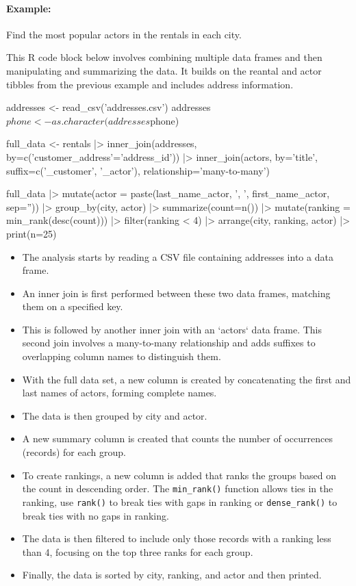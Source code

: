 \paragraph*{Example:} Find the most popular actors in the rentals in each city.

This R code block below involves combining multiple data frames and then manipulating and summarizing the data. It builds on the reantal and actor tibbles from the previous example and includes address information.

\begin{samepage}
\begin{Rcode}
addresses <- read_csv('addresses.csv')
addresses$phone <- as.character(addresses$phone)

full_data <- 
  rentals |> 
    inner_join(addresses, by=c('customer_address'='address_id')) |>
    inner_join(actors, by='title',
      suffix=c('_customer', '_actor'),
      relationship='many-to-many')
       
full_data |> 
  mutate(actor = 
    paste(last_name_actor, ', ', first_name_actor, sep='')) |>
  group_by(city, actor) |>
  summarize(count=n()) |>
  mutate(ranking = min_rank(desc(count))) |>
  filter(ranking < 4) |>
  arrange(city, ranking, actor) |>
  print(n=25)
\end{Rcode}
\end{samepage}

\begin{itemize} 
\item The analysis starts by reading a CSV file containing addresses into a data frame.
\item An inner join is first performed between these two data frames, matching them on a specified key. 
\item This is followed by another inner join with an `actors` data frame. This second join involves a many-to-many relationship and adds suffixes to overlapping column names to distinguish them.
\item With the full data set, a new column is created by concatenating the first and last names of actors, forming complete names. 
\item The data is then grouped by city and actor.
\item A new summary column is created that counts the number of occurrences (records) for each group.
\item To create rankings, a new column is added that ranks the groups based on the count in descending order. The \texttt{min\_rank()} function allows ties in the ranking, use \texttt{rank()} to break ties with gaps in ranking or \texttt{dense\_rank()} to break ties with no gaps in ranking.
\item The data is then filtered to include only those records with a ranking less than 4, focusing on the top three ranks for each group.
\item Finally, the data is sorted by city, ranking, and actor and then printed.
\end{itemize}


